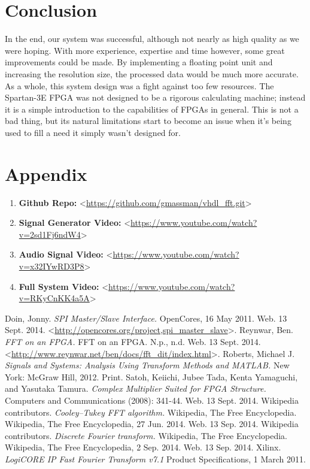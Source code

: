 \documentclass[12pt]{article}
\begin{document}
  \section*{Conclusion}
    In the end, our system was successful, although not nearly as high quality as we were hoping.
    With more experience, expertise and time however, some great improvements could be made.
    By implementing a floating point unit and increasing the resolution size, the processed data would be much more accurate.
    As a whole, this system design was a fight against too few resources. 
    The Spartan-3E FPGA was not designed to be a rigorous calculating machine; instead it is a simple introduction to the capabilities of FPGAs in general.
    This is not a bad thing, but its natural limitations start to become an issue when it's being used to fill a need it simply wasn't designed for.

  \clearpage
  \section*{Appendix}
    \begin{enumerate}
        \item \textbf{Github Repo:} \textless\url{https://github.com/gmassman/vhdl_fft.git}\textgreater
        \item \textbf{Signal Generator Video:} \textless\url{https://www.youtube.com/watch?v=2sd1Fj6ndW4}\textgreater
        \item \textbf{Audio Signal Video:} \textless\url{https://www.youtube.com/watch?v=x32IYwRD3P8}\textgreater
        \item \textbf{Full System Video:} \textless\url{https://www.youtube.com/watch?v=RKyCnKK4a5A}\textgreater
    \end{enumerate}

  \clearpage
  \begin{thebibliography}{9}
      Doin, Jonny. \emph{SPI Master/Slave Interface.} OpenCores, 16 May 2011. Web. 13 Sept. 2014. \textless\url{http://opencores.org/project,spi_master_slave}\textgreater.
      Reynwar, Ben. \emph{FFT on an FPGA.} FFT on an FPGA. N.p., n.d. Web. 13 Sept. 2014. \textless\url{http://www.reynwar.net/ben/docs/fft_dit/index.html}\textgreater.
      Roberts, Michael J. \emph{Signals and Systems: Analysis Using Transform Methods and MATLAB.} New York: McGraw Hill, 2012. Print.
      Satoh, Keiichi, Jubee Tada, Kenta Yamaguchi, and Yasutaka Tamura. \emph{Complex Multiplier Suited for FPGA Structure.} Computers and Communications (2008): 341-44. Web. 13 Sept. 2014.
      Wikipedia contributors. \emph{Cooley–Tukey FFT algorithm.} Wikipedia, The Free Encyclopedia. Wikipedia, The Free Encyclopedia, 27 Jun. 2014. Web. 13 Sep. 2014.
      Wikipedia contributors. \emph{Discrete Fourier transform.} Wikipedia, The Free Encyclopedia. Wikipedia, The Free Encyclopedia, 2 Sep. 2014. Web. 13 Sep. 2014.
      Xilinx. \emph{LogiCORE IP Fast Fourier Transform v7.1} Product Specifications, 1 March 2011. 
  \end{thebibliography}
\end{document}
